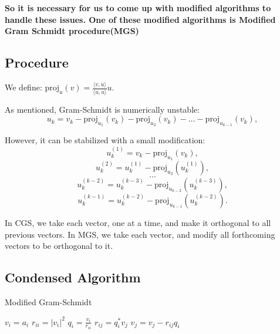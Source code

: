 \textbf{So it is necessary for us to come up with modified algorithms to handle these issues. One of these modified algorithms is Modified Gram Schmidt procedure(MGS)}

\subsection{Procedure}

We define: $\text{proj}_u(v) = \frac{\langle v, u \rangle}{\langle u, u \rangle}u$.

As mentioned, Gram-Schmidt is numerically unstable:
\[
u_k = v_k - \text{proj}_{u_1}(v_k) - \text{proj}_{u_2}(v_k) - \ldots - \text{proj}_{u_{k-1}}(v_k),
\]

However, it can be stabilized with a small modification:
\[
u^{(1)}_k = v_k - \text{proj}_{u_1}(v_k),
\]
\[
u^{(2)}_k = u^{(1)}_k - \text{proj}_{u_2}(u^{(1)}_k),
\]
\[
\ldots
\]
\[
u^{(k-2)}_k = u^{(k-3)}_k - \text{proj}_{u_{k-2}}(u^{(k-3)}_k),
\]
\[
u^{(k-1)}_k = u^{(k-2)}_k - \text{proj}_{u_{k-1}}(u^{(k-2)}_k).
\]


\begin{outline}
    In CGS, we take each vector, one at a time, and make it
orthogonal to all previous vectors. In MGS, we take each
vector, and modify all forthcoming vectors to be
orthogonal to it.
\end{outline}



\subsection{Condensed Algorithm}

\begin{algorithm}
\caption{Modified Gram-Schmidt}
\begin{algorithmic}[1]
        \State $v_i = a_i$
    \EndFor
        \State $r_{ii} = |v_i|^2$
        \State $q_i = \frac{v_i}{r_{ii}}$
            \State $r_{ij} = q_i^* v_j$
            \State $v_j = v_j - r_{ij} q_i$
        \EndFor
    \EndFor
\end{algorithmic}
\end{algorithm}


